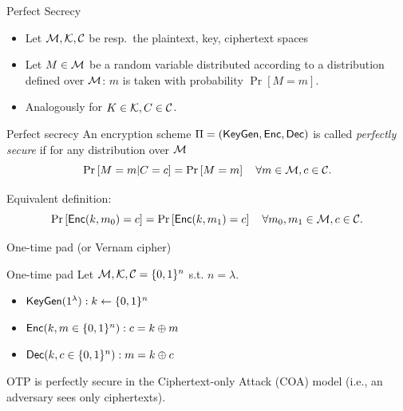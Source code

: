 \documentclass[usenames,dvipsnames, 9pt,aspectratio=169]{beamer}
\begin{document}
\begin{frame}{Perfect Secrecy}
\Large
	\begin{itemize}
		\item Let $\mathcal{M}, \mathcal{K}, \mathcal{C}$ be resp.\ the plaintext, key, ciphertext spaces
		
		\item Let $M \in \mathcal{M}$ be a random variable distributed according to a distribution defined over $\mathcal{M}$:
		$m$ is taken with  probability $\Pr[M = m]$.
		
		\item Analogously for $K \in \mathcal{K}, C \in \mathcal{C}$.
	\end{itemize}
\pause
	\begin{block}{Perfect secrecy}
		An encryption scheme $\Pi = (\textsf{KeyGen}, \textsf{Enc}, \textsf{Dec})$ is called \emph{perfectly secure} if for any distribution over $\mathcal{M}$
		\[
			\Pr \left[ M= m | C = c\right] = \Pr\left[M = m\right] \quad \forall m \in \mathcal{M}, c \in \mathcal{C}.
		\]
	\end{block}

	Equivalent definition:
	\[
		\Pr\left[\textsf{Enc}(k, m_0) = c\right] = \Pr\left[\textsf{Enc}(k, m_1) = c\right] \quad \forall m_0, m_1 \in \mathcal{M}, c \in \mathcal{C}.
	\]
\end{frame}

\begin{frame}{One-time pad (or Vernam cipher)}
\LARGE
\begin{block}{One-time pad}
	Let $\mathcal{M}, \mathcal{K}, \mathcal{C} = \{0,1\}^n$ s.t. $n = \lambda$.
	\begin{itemize}
		\item $\textsf{KeyGen}(1^{\lambda}): k \leftarrow \{0,1\}^n$ \\[10pt]
		\item $\textsf{Enc}(k, m \in \{0,1\}^n): c = k \oplus m$ \\[10pt]
		\item $\textsf{Dec}(k, c \in \{0,1\}^n): m = k \oplus c$ \\[10pt]
	\end{itemize}
\end{block}

\begin{theorem}
	OTP is perfectly secure in the Ciphertext-only Attack (COA) model (i.e., an adversary sees only ciphertexts).
\end{theorem}

\end{frame}
\end{document}
